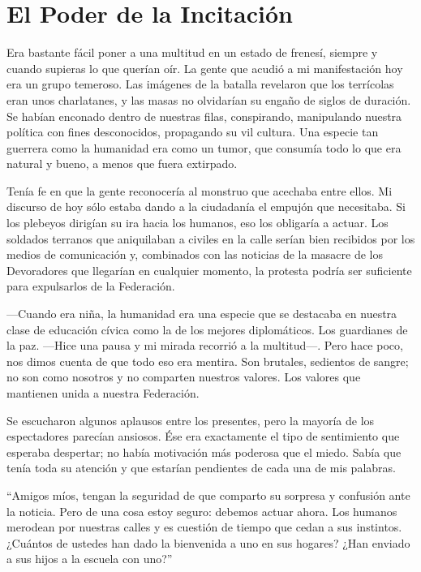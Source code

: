 \chapter{El Poder de la Incitación}\label{sec:el-poder-de-la-incitacion}

Era bastante fácil poner a una multitud en un estado de frenesí, siempre y cuando supieras lo que querían oír. La gente que acudió a mi manifestación hoy era un grupo temeroso. Las imágenes de la batalla revelaron que los terrícolas eran unos charlatanes, y las masas no olvidarían su engaño de siglos de duración. Se habían enconado dentro de nuestras filas, conspirando, manipulando nuestra política con fines desconocidos, propagando su vil cultura. Una especie tan guerrera como la humanidad era como un tumor, que consumía todo lo que era natural y bueno, a menos que fuera extirpado.

Tenía fe en que la gente reconocería al monstruo que acechaba entre ellos. Mi discurso de hoy sólo estaba dando a la ciudadanía el empujón que necesitaba. Si los plebeyos dirigían su ira hacia los humanos, eso los obligaría a actuar. Los soldados terranos que aniquilaban a civiles en la calle serían bien recibidos por los medios de comunicación y, combinados con las noticias de la masacre de los Devoradores que llegarían en cualquier momento, la protesta podría ser suficiente para expulsarlos de la Federación.

—Cuando era niña, la humanidad era una especie que se destacaba en nuestra clase de educación cívica como la de los mejores diplomáticos. Los guardianes de la paz. —Hice una pausa y mi mirada recorrió a la multitud—. Pero hace poco, nos dimos cuenta de que todo eso era mentira. Son brutales, sedientos de sangre; no son como nosotros y no comparten nuestros valores. Los valores que mantienen unida a nuestra Federación.

Se escucharon algunos aplausos entre los presentes, pero la mayoría de los espectadores parecían ansiosos. Ése era exactamente el tipo de sentimiento que esperaba despertar; no había motivación más poderosa que el miedo. Sabía que tenía toda su atención y que estarían pendientes de cada una de mis palabras.

``Amigos míos, tengan la seguridad de que comparto su sorpresa y confusión ante la noticia. Pero de una cosa estoy seguro: debemos actuar ahora. Los humanos merodean por nuestras calles y es cuestión de tiempo que cedan a sus instintos. ¿Cuántos de ustedes han dado la bienvenida a uno en sus hogares? ¿Han enviado a sus hijos a la escuela con uno?''

